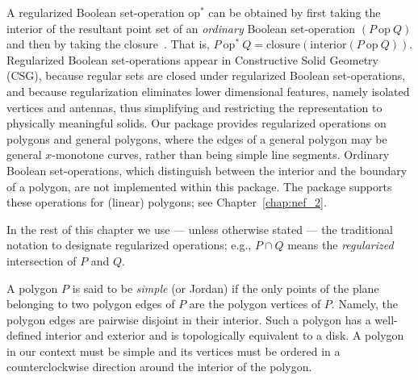 A regularized Boolean set-operation $\mbox{op}^*$ can be obtained by
first taking the interior of the resultant point set of an {\em ordinary}
Boolean set-operation $(P\ \mbox{op}\ Q)$ and then by taking the
closure~\cite{cgal:h-sm-04}. That is,
$P\ \mbox{op}^*\ Q = \mbox{closure}(\mbox{interior} (P\ \mbox{op}\ Q))$.
Regularized Boolean set-operations appear in Constructive Solid
Geometry (CSG), because regular sets are closed under regularized
Boolean set-operations, and because regularization eliminates lower
dimensional features, namely isolated vertices and antennas, thus
simplifying and restricting the representation to physically meaningful
solids. Our package provides regularized operations on polygons and
general polygons, where the edges of a general polygon may be
general $x$-monotone curves, rather than being simple line segments.
Ordinary Boolean set-operations, which distinguish between the
interior and the boundary of a polygon, are not implemented within this
package. The  package supports these operations for (linear)
polygons; see Chapter~\ref{chap:nef_2}.

In the rest of this chapter we use --- unless otherwise stated --- the
traditional notation to designate regularized operations; e.g., $P \cap Q$
means the {\em regularized} intersection of $P$ and $Q$.

A polygon $P$ is said to be {\em simple} (or Jordan) if the only
points of the plane belonging to two polygon edges of $P$ are the
polygon vertices of $P$. Namely, the polygon edges are pairwise
disjoint in their interior. Such a polygon has a well-defined interior
and exterior and is topologically equivalent to a disk. A polygon in our
context must be simple and its vertices must be ordered in a
counterclockwise direction around the interior of the polygon.
 

